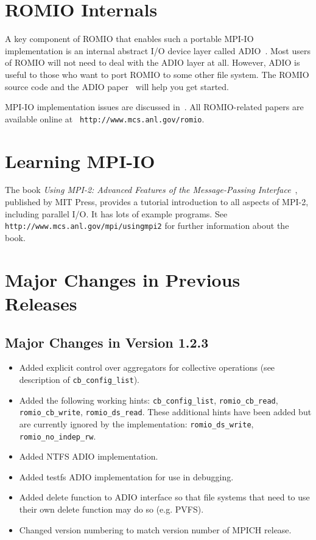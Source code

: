 %
%
\section{ROMIO Internals}
A key component of ROMIO that enables such a portable MPI-IO
implementation is an internal abstract I/O device layer called
ADIO~\cite{thak96e}. Most users of ROMIO will not need to deal with
the ADIO layer at all. However, ADIO is useful to those who want to
port ROMIO to some other file system. The ROMIO source code and the
ADIO paper~\cite{thak96e} will help you get started.

MPI-IO implementation issues are discussed in~\cite{thak99b}. All
ROMIO-related papers are available online at {\tt
http://www.mcs.anl.gov/romio}.


\section{Learning MPI-IO}
The book {\em Using MPI-2: Advanced Features of the Message-Passing
Interface}~\cite{grop99a}, published by MIT Press, provides a tutorial
introduction to all aspects of MPI-2, including parallel I/O. It has
lots of example programs. See {\tt
http://www.mcs.anl.gov/mpi/usingmpi2} for further information about
the book.

%
%
\section{Major Changes in Previous Releases}

\subsection{Major Changes in Version 1.2.3}
\begin{itemize}
\item Added explicit control over aggregators for collective operations
      (see description of \texttt{cb\_config\_list}).
\item Added the following working hints: \texttt{cb\_config\_list},
      \texttt{romio\_cb\_read}, \texttt{romio\_cb\_write},\newline
      \texttt{romio\_ds\_read}.  These additional hints have
      been added but are currently ignored by the implementation:
      \texttt{romio\_ds\_write}, \texttt{romio\_no\_indep\_rw}.
\item Added NTFS ADIO implementation.
\item Added testfs ADIO implementation for use in debugging.
\item Added delete function to ADIO interface so that file systems that
      need to use their own delete function may do so (e.g. PVFS).
\item Changed version numbering to match version number of MPICH release.
\end{itemize}

